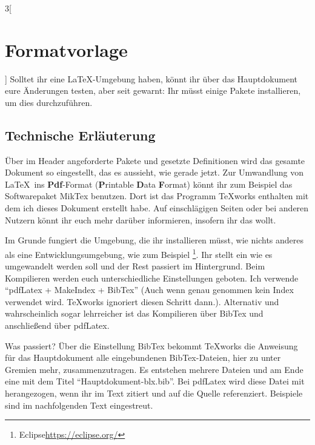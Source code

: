 \begin{multicols}{3}[\section{Formatvorlage}]
Solltet ihr eine \LaTeX-Umgebung haben, könnt ihr über das Hauptdokument eure Änderungen testen, aber seit gewarnt: Ihr müsst einige Pakete installieren, um dies durchzuführen.

\subsection*{Technische Erläuterung}
Über im Header angeforderte Pakete und gesetzte Definitionen wird das gesamte Dokument so eingestellt, das es aussieht, wie gerade jetzt. Zur Umwandlung von \LaTeX~ins \textbf{Pdf}-Format (\textbf{P}rintable \textbf{D}ata \textbf{F}ormat) könnt ihr zum Beispiel das Softwarepaket MikTex benutzen. Dort ist das Programm TeXworks enthalten mit dem ich dieses Dokument erstellt habe. Auf einschlägigen Seiten oder bei anderen Nutzern könnt ihr euch mehr darüber informieren, insofern ihr das wollt. 

Im Grunde fungiert die Umgebung, die ihr installieren müsst, wie nichts anderes als eine Entwicklungsumgebung, wie zum Beispiel \footnote{Eclipse\url{https://eclipse.org/}}. Ihr stellt ein wie es umgewandelt werden soll und der Rest passiert im Hintergrund. Beim Kompilieren werden euch unterschiedliche Einstellungen geboten. Ich verwende \enquote{pdfLatex + MakeIndex + BibTex} (Auch wenn genau genommen kein Index verwendet wird. TeXworks ignoriert diesen Schritt dann.). Alternativ und wahrscheinlich sogar lehrreicher ist das Kompilieren über BibTex und anschließend über pdfLatex. 

Was passiert? Über die Einstellung BibTex bekommt TeXworks die Anweisung für das Hauptdokument alle eingebundenen BibTex-Dateien, hier zu unter Gremien mehr, zusammenzutragen. Es entstehen mehrere Dateien und am Ende eine mit dem Titel \enquote{Hauptdokument-blx.bib}. Bei pdfLatex wird diese Datei mit herangezogen, wenn ihr im Text zitiert und auf die Quelle referenziert. Beispiele sind im nachfolgenden Text eingestreut. 




\end{multicols}
